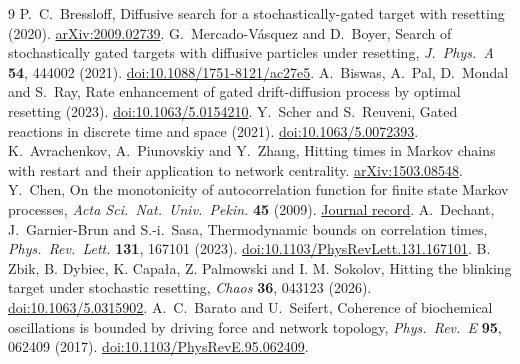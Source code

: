 \documentclass[11pt]{article}
\begin{document}
\begin{thebibliography}{9}
 P.\ C.\ Bressloff, Diffusive search for a stochastically-gated target with resetting (2020). \href{https://arxiv.org/abs/2009.02739}{arXiv:2009.02739}.
 G.\ Mercado-V\'asquez and D.\ Boyer, Search of stochastically gated targets with diffusive particles under resetting, \emph{J.\ Phys.\ A} \textbf{54}, 444002 (2021). \href{https://doi.org/10.1088/1751-8121/ac27e5}{doi:10.1088/1751-8121/ac27e5}.
 A.\ Biswas, A.\ Pal, D.\ Mondal and S.\ Ray, Rate enhancement of gated drift-diffusion process by optimal resetting (2023). \href{https://doi.org/10.1063/5.0154210}{doi:10.1063/5.0154210}.
 Y.\ Scher and S.\ Reuveni, Gated reactions in discrete time and space (2021). \href{https://doi.org/10.1063/5.0072393}{doi:10.1063/5.0072393}.
 K.\ Avrachenkov, A.\ Piunovskiy and Y.\ Zhang, Hitting times in Markov chains with restart and their application to network centrality. \href{https://arxiv.org/abs/1503.08548}{arXiv:1503.08548}.
 Y.\ Chen, On the monotonicity of autocorrelation function for finite state Markov processes, \emph{Acta Sci.\ Nat.\ Univ.\ Pekin.} \textbf{45} (2009). \href{https://xbna.pku.edu.cn/EN/Y2009/V45/I1/11}{Journal record}.
 A.\ Dechant, J.\ Garnier-Brun and S.-i.\ Sasa, Thermodynamic bounds on correlation times, \emph{Phys.\ Rev.\ Lett.} \textbf{131}, 167101 (2023). \href{https://doi.org/10.1103/PhysRevLett.131.167101}{doi:10.1103/PhysRevLett.131.167101}.
 B. Zbik, B. Dybiec, K. Capała, Z. Palmowski and I. M. Sokolov, Hitting the blinking target under stochastic resetting, \emph{Chaos} \textbf{36}, 043123 (2026). \href{https://doi.org/10.1063/5.0315902}{doi:10.1063/5.0315902}.
 A.\ C.\ Barato and U.\ Seifert, Coherence of biochemical oscillations is bounded by driving force and network topology, \emph{Phys.\ Rev.\ E} \textbf{95}, 062409 (2017). \href{https://doi.org/10.1103/PhysRevE.95.062409}{doi:10.1103/PhysRevE.95.062409}.
\end{thebibliography}
\end{document}
